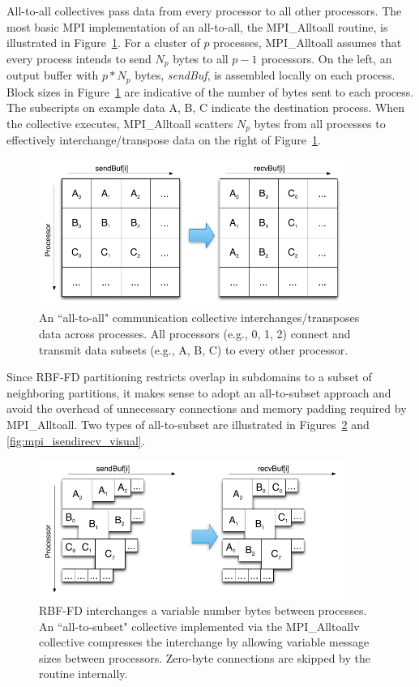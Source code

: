 \documentclass{report}
\begin{document}
All-to-all collectives pass data from every processor to all other processors. The most basic MPI implementation of an all-to-all, the MPI\_Alltoall routine, is illustrated in Figure~\ref{fig:mpi_alltoall_visual}. For a cluster of $p$ processes, MPI\_Alltoall assumes that every process intends to send $N_p$ bytes to all $p-1$ processors. On the left, an output buffer with $p*N_p$ bytes, \emph{sendBuf}, is assembled locally on each process. Block sizes in Figure~\ref{fig:mpi_alltoall_visual} are indicative of the number of bytes sent to each process. The subscripts on example data A, B, C indicate the destination process.  When the collective executes, MPI\_Alltoall scatters $N_p$ bytes from all processes to effectively interchange/transpose data on the right of Figure~\ref{fig:mpi_alltoall_visual}. 

\begin{figure}
\centering
\includegraphics[width=10cm]{../figures/omnigraffle/MPI_Alltoall_Visual.png}
\caption{An ``all-to-all" communication collective interchanges/transposes data across processes. All processors (e.g., 0, 1, 2) connect and transmit data subsets (e.g., A, B, C) to every other processor.}
\label{fig:mpi_alltoall_visual}
\end{figure}

Since RBF-FD partitioning restricts overlap in subdomains to a subset of neighboring partitions, it makes sense to adopt an all-to-subset approach and avoid the overhead of unnecessary connections and memory padding required by MPI\_Alltoall. 
Two types of all-to-subset are illustrated in Figures~\ref{fig:mpi_alltoallv_visual} and \ref{fig:mpi_isendirecv_visual}. 


\begin{figure}
\centering
\includegraphics[width=10cm]{../figures/omnigraffle/MPI_Alltoallv_Visual.png}
\caption{RBF-FD interchanges a variable number bytes between processes. An ``all-to-subset" collective implemented via the MPI\_Alltoallv collective compresses the interchange by allowing variable message sizes between processors. Zero-byte connections are skipped by the routine internally.}
\label{fig:mpi_alltoallv_visual}
\end{figure}
\end{document}
